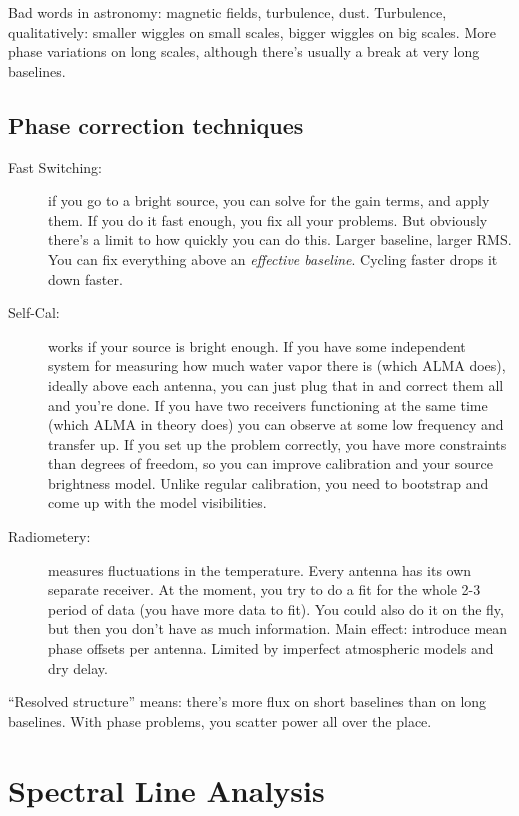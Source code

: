 \documentclass[a4paper]{article}
\begin{document}
Bad words in astronomy: magnetic fields, turbulence, dust. Turbulence, qualitatively: smaller wiggles on small scales, bigger wiggles on big scales. More phase variations on long scales, although there's usually a break at very long baselines. 

\subsection{Phase correction techniques}

\begin{description}

\item[Fast Switching:] if you go to a bright source, you can solve for the gain terms, and apply them. If you do it fast enough, you fix all your problems. But obviously there's a limit to how quickly you can do this. Larger baseline, larger RMS. You can fix everything above an \emph{effective baseline}. Cycling faster drops it down faster. 

\item[Self-Cal:] works if your source is bright enough. If you have some independent system for measuring how much water vapor there is (which ALMA does), ideally above each antenna, you can just plug that in and correct them all and you're done. If you have two receivers functioning at the same time (which ALMA in theory does) you can observe at some low frequency and transfer up. If you set up the problem correctly, you have more constraints than degrees of freedom, so you can improve calibration and your source brightness model. Unlike regular calibration, you need to bootstrap and come up with the model visibilities. 

\item[Radiometery:] measures fluctuations in the temperature. Every antenna has its own separate receiver. At the moment, you try to do a fit for the whole 2-3 period of data (you have more data to fit). You could also do it on the fly, but then you don't have as much information. Main effect: introduce mean phase offsets per antenna. Limited by imperfect atmospheric models and dry delay. 

\end{description}

``Resolved structure'' means: there's more flux on short baselines than on long baselines. With phase problems, you scatter power all over the place. 

\section{Spectral Line Analysis}
\end{document}

